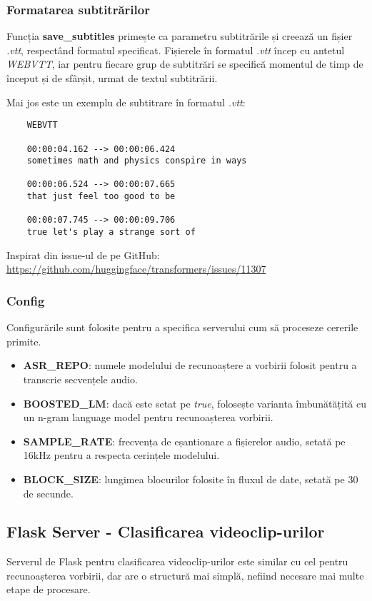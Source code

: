 \subsubsection{Formatarea subtitrărilor}
Funcția \textbf{save\_subtitles} primește ca parametru subtitrările și creează un fișier \textit{.vtt},
respectând formatul specificat. Fișierele în formatul \textit{.vtt} încep cu antetul \textit{WEBVTT},
iar pentru fiecare grup de subtitrări se specifică momentul de timp de început și de sfârșit, urmat
de textul subtitrării.
\par
Mai jos este un exemplu de subtitrare în formatul \textit{.vtt}:

\begin{verbatim}
    WEBVTT

    00:00:04.162 --> 00:00:06.424
    sometimes math and physics conspire in ways

    00:00:06.524 --> 00:00:07.665
    that just feel too good to be

    00:00:07.745 --> 00:00:09.706
    true let's play a strange sort of
\end{verbatim}


\par
Inspirat din issue-ul de pe GitHub: \url{https://github.com/huggingface/transformers/issues/11307}

\subsubsection{Config}
Configurările sunt folosite pentru a specifica serverului cum să proceseze cererile primite.
\begin{itemize}
    \item \textbf{ASR\_REPO}: numele modelului de recunoaștere a vorbirii folosit pentru a transcrie
    secvențele audio.
    \item \textbf{BOOSTED\_LM}: dacă este setat pe \textit{true}, folosește varianta îmbunătățită cu
    un n-gram language model pentru recunoașterea vorbirii.
    \item \textbf{SAMPLE\_RATE}: frecvența de eșantionare a fișierelor audio, setată pe 16kHz pentru
    a respecta cerințele modelului.
    \item \textbf{BLOCK\_SIZE}: lungimea blocurilor folosite în fluxul de date, setată pe 30 de secunde.
\end{itemize}

\subsection{Flask Server - Clasificarea videoclip-urilor}
Serverul de Flask pentru clasificarea videoclip-urilor este similar cu cel pentru recunoașterea vorbirii,
dar are o structură mai simplă, nefiind necesare mai multe etape de procesare.
